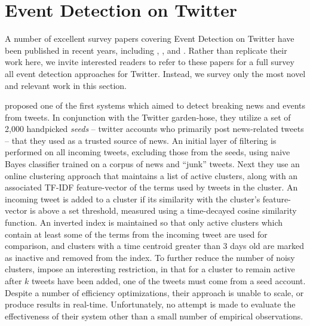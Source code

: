 \section{Event Detection on Twitter}
A number of excellent survey papers covering Event Detection on Twitter have been published in recent years, including \cite{Hasan17}, \cite{Goswami2016}, and \cite{Atefeh2015}. Rather than replicate their work here, we invite interested readers to refer to these papers for a full survey all event detection approaches for Twitter.
Instead, we survey only the most novel and relevant work in this section.

\cite{sankaranarayanan2009twitterstand} proposed one of the first systems which aimed to detect breaking news and events from tweets. In conjunction with the Twitter garden-hose, they utilize a set of 2,000 handpicked \emph{seeds} -- twitter accounts who primarily post news-related tweets -- that they used as a trusted source of news.
An initial layer of filtering is performed on all incoming tweets, excluding those from the seeds, using naive Bayes classifier trained on a corpus of news and ``junk'' tweets. Next they use an online clustering approach that maintains a list of active clusters, along with an associated TF-IDF \citep{Salton:1988:TAA:54259.54260} feature-vector of the terms used by tweets in the cluster. An incoming tweet is added to a cluster if its similarity with the cluster's feature-vector is above a set threshold, measured using a time-decayed cosine similarity function. An inverted index is maintained so that only active clusters which contain at least some of the terms from the incoming tweet are used for comparison, and clusters with a time centroid greater than 3 days old are marked as inactive and removed from the index.
To further reduce the number of noisy clusters, \cite{sankaranarayanan2009twitterstand} impose an interesting restriction, in that for a cluster to remain active after \(k\) tweets have been added, one of the tweets must come from a seed account.
Despite a number of efficiency optimizations, their approach is unable to scale, or produce results in real-time. Unfortunately, no attempt is made to evaluate the effectiveness of their system other than a small number of empirical observations.

